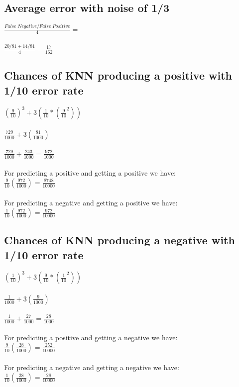 \documentclass{article}
\begin{document}
\subsection*{Average error with noise of 1/3}
$\frac{False \;Negative/False \;Positive}{4} =$\\\\
$ \frac{20/81 + 14/81}{4}  = \frac{17}{162}$

\subsection*{Chances of KNN producing a positive with 1/10 error rate}
$(\frac{9}{10})^3 + 3 (\frac{1}{10} * (\frac{9}{10}^2))$\\\\
$\frac{729}{1000} + 3(\frac{81}{1000})$\\\\  
$\frac{729}{1000} + \frac{243}{1000} = \frac{972}{1000}$\\\\  

For predicting a positive and getting a positive we have:\\
$\frac{9}{10}(\frac{972}{1000}) = \frac{8748}{10000}$\\\\
For predicting a negative and getting a positive we have:\\
$\frac{1}{10}(\frac{972}{1000}) = \frac{972}{10000}$\\

\subsection*{Chances of KNN producing a negative with 1/10 error rate}
$(\frac{1}{10})^3 + 3 (\frac{9}{10} * (\frac{1}{10}^2))$\\\\
$\frac{1}{1000} + 3(\frac{9}{1000})$\\\\
$\frac{1}{1000} + \frac{27}{1000} = \frac{28}{1000}$\\\\
For predicting a positive and getting a negative we have:\\

$\frac{9}{10}(\frac{28}{1000}) = \frac{252}{10000}$\\\\
For predicting a negative and getting a negative we have:\\
$\frac{1}{10}(\frac{28}{1000}) = \frac{28}{10000}$\\
\end{document}
